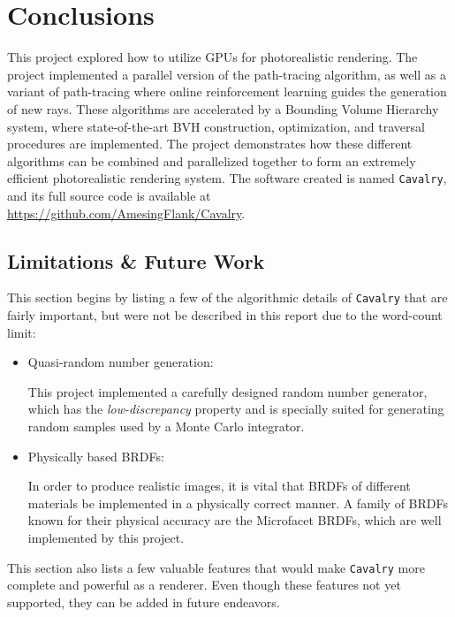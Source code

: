 \chapter{Conclusions}

This project explored how to utilize GPUs for photorealistic rendering. The project implemented a parallel version of the path-tracing algorithm, as well as a variant of path-tracing where online reinforcement learning guides the generation of new rays. These algorithms are accelerated by a Bounding Volume Hierarchy system, where state-of-the-art BVH construction, optimization, and traversal procedures are implemented. The project demonstrates how these different algorithms can be combined and parallelized together to form an extremely efficient photorealistic rendering system. The software created is named \texttt{Cavalry}, and its full source code is available at \url{https://github.com/AmesingFlank/Cavalry}.

\section{Limitations \& Future Work}
This section begins by listing a few of the algorithmic details of \texttt{Cavalry} that are fairly important, but were not be described in this report due to the word-count limit:
\begin{itemize}
    \item Quasi-random number generation:
    
    This project implemented a carefully designed random number generator, which has the \textit{low-discrepancy} property and is specially suited for generating random samples used by a Monte Carlo integrator. 

    \item Physically based BRDFs:
    
    In order to produce realistic images, it is vital that BRDFs of different materials be implemented in a physically correct manner. A family of BRDFs known for their physical accuracy are the Microfacet BRDFs\cite{cook1982reflectance}, which are well implemented by this project. 

\end{itemize}

\label{section limitations}
This section also lists a few valuable features that would make \texttt{Cavalry} more complete and powerful as a renderer. Even though these features not yet supported, they can be added in future endeavors.

